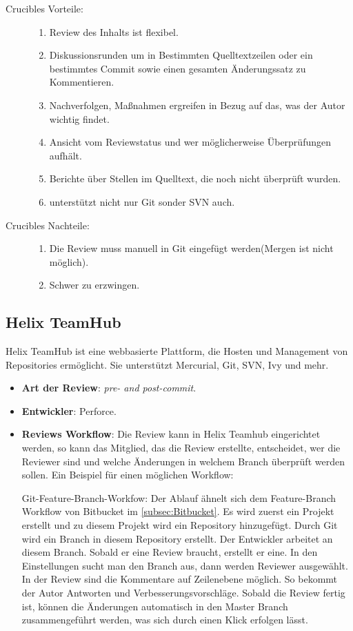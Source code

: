 \begin{description}
	\item [Crucibles Vorteile:] \hfill
	\begin{enumerate}
		\item Review des Inhalts ist flexibel.
		\item Diskussionsrunden um in Bestimmten Quelltextzeilen oder ein bestimmtes Commit sowie einen gesamten Änderungssatz zu Kommentieren.
		\item Nachverfolgen, Maßnahmen ergreifen in Bezug auf das, was der Autor wichtig findet.
		\item Ansicht vom Reviewstatus und wer möglicherweise Überprüfungen aufhält.
		\item Berichte über Stellen im Quelltext, die noch nicht überprüft wurden.
		\item unterstützt nicht nur Git sonder \ac{SVN} auch.
	\end{enumerate}
	
	\item [Crucibles Nachteile:] \hfill
	\begin{enumerate}
		\item Die Review muss manuell in Git eingefügt werden(Mergen ist nicht möglich).
		\item Schwer zu erzwingen.
	\end{enumerate}
\end{description}

\subsection{Helix TeamHub}
\label{subsec:HelixTeamHub}

Helix TeamHub ist eine webbasierte Plattform, die Hosten und Management von Repositories ermöglicht. Sie unterstützt Mercurial, Git, \ac{SVN}, Ivy und mehr.

\begin{itemize}
	\item \textbf{Art der Review}: \textit{pre- and post-commit}.
	\item \textbf{Entwickler}: Perforce. 
	\item \textbf{Reviews Workflow}: Die Review kann in Helix Teamhub eingerichtet werden, so kann das Mitglied, das die Review erstellte, entscheidet, wer die Reviewer
		 sind und welche Änderungen in welchem Branch überprüft werden sollen.
		 Ein Beispiel für einen möglichen Workflow:
		 
		  Git-Feature-Branch-Workfow: Der Ablauf ähnelt sich dem Feature-Branch Workflow von Bitbucket im \cref{subsec:Bitbucket}.
		  Es wird zuerst ein Projekt erstellt und zu diesem Projekt wird ein Repository hinzugefügt. Durch Git wird ein Branch in diesem Repository
		  erstellt. Der Entwickler arbeitet an diesem Branch. Sobald er eine Review braucht, erstellt er eine. In den Einstellungen sucht man den Branch aus, dann werden Reviewer
		  ausgewählt. In der Review sind die Kommentare auf Zeilenebene möglich. So bekommt der Autor Antworten und Verbesserungsvorschläge. Sobald die Review fertig ist,
		  können die Änderungen automatisch in den Master Branch zusammengeführt werden, was sich durch einen Klick erfolgen lässt. 
\end{itemize}

